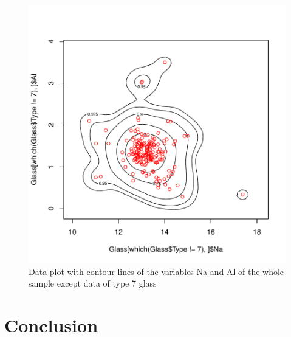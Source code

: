 \documentclass[a4paper, 12pt, titlepage, headsepline, listof = totoc, bibliography = totoc, numbers = noenddot]{scrartcl}
\begin{document}
\begin{figure}[h!]
\includegraphics[width=\textwidth]{report-contourGlassNaAl-7}
\caption{Data plot with contour lines of the variables Na and Al of the whole sample except data of type 7 glass}
\label{fig:contourGlassNaAl-7}
\end{figure}


\newpage
\section{Conclusion}\label{sec:conclusion}








\newpage
\end{document}
